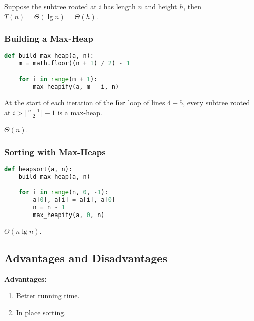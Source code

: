 \documentclass[11pt]{article}
\begin{document}
\begin{rtime*}
Suppose the subtree rooted at $i$ has length $n$ and height $h$, then
$T(n) = \Theta(\lg n) = \Theta(h)$.
\end{rtime*}

\subsubsection{Building a Max-Heap}

\begin{lstlisting}[language=Python]
def build_max_heap(a, n):
    m = math.floor((n + 1) / 2) - 1

    for i in range(m + 1):
        max_heapify(a, m - i, n)
\end{lstlisting}

\begin{inv*}
At the start of each iteration of the \textbf{for} loop of lines $4-5$, every subtree
rooted at $i > \lfloor\frac{n+1}{2}\rfloor - 1$ is a max-heap.
\end{inv*}

\begin{rtime*}
$\Theta(n)$.
\end{rtime*}

\subsubsection{Sorting with Max-Heaps}

\begin{lstlisting}[language=Python]
def heapsort(a, n):
    build_max_heap(a, n)

    for i in range(n, 0, -1):
        a[0], a[i] = a[i], a[0]
        n = n - 1
        max_heapify(a, 0, n)
\end{lstlisting}

\begin{rtime*}
$\Theta(n\lg n)$.
\end{rtime*}

\subsection{Advantages and Disadvantages}

\textbf{Advantages:}
\begin{enumerate}
\item Better running time.
\item In place sorting.
\end{enumerate}
\end{document}
